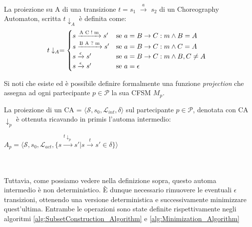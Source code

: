 \begin{definition}[Proiezione]
    La proiezione su A di una transizione $t = s_1$ $\xrightarrow{a}$ $s_2$ di un Choreography Automaton, scritta $t\downarrow_{A}$ è definita come:
    \begin{equation*}
        t \downarrow_{A} =
        \begin{cases}
            s \xrightarrow{\text{A C ! m}} s' & $se $ a = B \rightarrow C : m \wedge B = A       \\
            s \xrightarrow{\text{B A ? m}} s' & $se $ a = B \rightarrow C : m \wedge C = A       \\
            s \xrightarrow{\epsilon} s'       & $se $ a = B \rightarrow C : m \wedge B, C \neq A \\
            s \xrightarrow{\epsilon} s'       & $se $ a = \epsilon
        \end{cases}
    \end{equation*}
\end{definition}
\begin{remark}
    Si noti che esiste ed è possibile definire formalmente una funzione \emph{projection} che assegna ad ogni partecipante $p \in \mathcal{P}$ la sua CFSM $M_p$.
\end{remark}
La proiezione di un CA = $\langle \mathcal{S}, s_0, \mathcal{L}_{int}, \delta \rangle$ sul partecipante $p \in \mathcal{P}$, denotata con CA$\downarrow_p$ è ottenuta ricavando in primis l'automa intermedio: \bigskip \\
\centerline{$A_p = \langle \mathcal{S}, s_0, \mathcal{L}_{act}, \{ s \xrightarrow{t\downarrow_{p}} s' | s \xrightarrow{t} s' \in \delta \} \rangle$}
\\ \\
Tuttavia, come possiamo vedere nella definizione sopra, questo automa intermedio è non deterministico. È dunque necessario rimuovere le eventuali $\epsilon$ transizioni, ottenendo una versione deterministica e successivamente minimizzare quest'ultima. Entrambe le operazioni sono state definite rispettivamente negli algoritmi \ref{alg:SubsetConstruction_Algorithm} e \ref{alg:Minimization_Algorithm}

